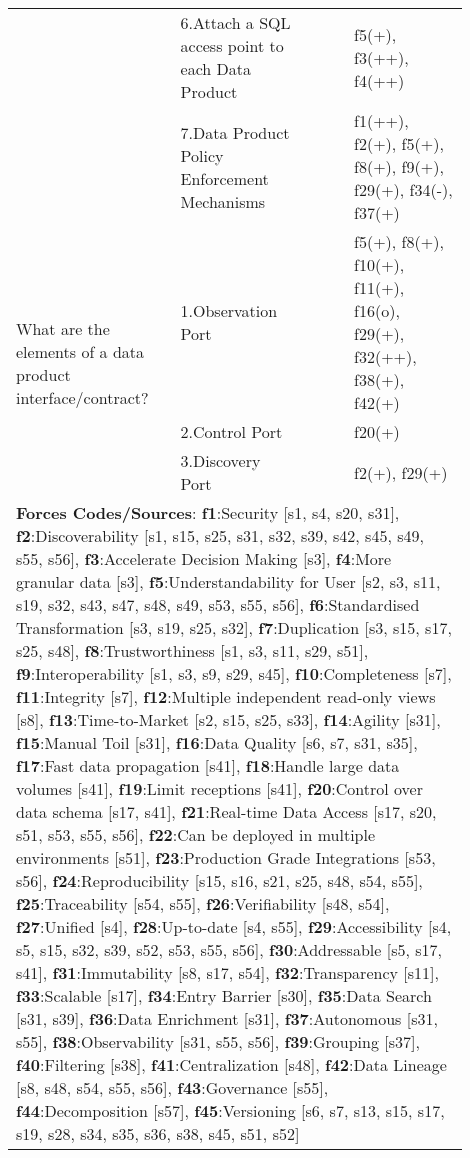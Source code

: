 \begin{tabular}{|p{0.12\linewidth}|p{0.015\linewidth}|p{0.3\linewidth}|p{0.15\linewidth}|p{0.31\linewidth}|}
 & \cellcolor{emerald_shape_7}{} & 6.Attach a SQL access point to each Data Product&\cellcolor{emerald_shape_5}{s2, s3, s5, s7, s10, s13, s14, s15, s16, s27, s30, s31, s32, s36, s37, s38, s39, s43, s46, s48, s49} & f5(+), f3(++), f4(++)\\
 & \multirow{-7}{\linewidth}{ \cellcolor{emerald_shape_7}{49}} &7.Data Product Policy Enforcement Mechanisms&\cellcolor{emerald_shape_5}{s1, s3, s4, s5, s6, s12, s15, s20, s23, s27, s31, s32, s36, s38, s39, s40, s43, s47, s52, s56} & f1(++), f2(+), f5(+), f8(+), f9(+), f29(+), f34(-), f37(+)\\
\multirow{3}{\linewidth}{What are the elements of a data product interface/contract?} &\cellcolor{emerald_shape_3}{} &1.Observation Port&\cellcolor{emerald_shape_6}{s3, s7, s11, s13, s22, s52} & f5(+), f8(+), f10(+), f11(+), f16(o), f29(+), f32(++), f38(+), f42(+)\\
 & \cellcolor{emerald_shape_3}{} & 2.Control Port&\cellcolor{emerald_shape_4}{s49, s52} & f20(+)\\
 & \multirow{-3}{\linewidth}{ \cellcolor{emerald_shape_3}{9}} &3.Discovery Port&\cellcolor{emerald_shape_5}{s20, s25, s49, s52} & f2(+), f29(+)\\
\hline
\multicolumn{5}{l}{\parbox{\textwidth}{\smallskip
{\bf Forces Codes/Sources}: {\bf f1}:Security [s1, s4, s20, s31], {\bf f2}:Discoverability [s1, s15, s25, s31, s32, s39, s42, s45, s49, s55, s56], {\bf f3}:Accelerate Decision Making [s3], {\bf f4}:More granular data [s3], {\bf f5}:Understandability for User [s2, s3, s11, s19, s32, s43, s47, s48, s49, s53, s55, s56], {\bf f6}:Standardised Transformation [s3, s19, s25, s32], {\bf f7}:Duplication [s3, s15, s17, s25, s48], {\bf f8}:Trustworthiness [s1, s3, s11, s29, s51], {\bf f9}:Interoperability [s1, s3, s9, s29, s45], {\bf f10}:Completeness [s7], {\bf f11}:Integrity [s7], {\bf f12}:Multiple independent read-only views [s8], {\bf f13}:Time-to-Market [s2, s15, s25, s33], {\bf f14}:Agility [s31], {\bf f15}:Manual Toil [s31], {\bf f16}:Data Quality [s6, s7, s31, s35], {\bf f17}:Fast data propagation [s41], {\bf f18}:Handle large data volumes [s41], {\bf f19}:Limit receptions [s41], {\bf f20}:Control over data schema [s17, s41], {\bf f21}:Real-time Data Access [s17, s20, s51, s53, s55, s56], {\bf f22}:Can be deployed in multiple environments [s51], {\bf f23}:Production Grade Integrations [s53, s56], {\bf f24}:Reproducibility [s15, s16, s21, s25, s48, s54, s55], {\bf f25}:Traceability [s54, s55], {\bf f26}:Verifiability [s48, s54], {\bf f27}:Unified [s4], {\bf f28}:Up-to-date [s4, s55], {\bf f29}:Accessibility [s4, s5, s15, s32, s39, s52, s53, s55, s56], {\bf f30}:Addressable [s5, s17, s41], {\bf f31}:Immutability [s8, s17, s54], {\bf f32}:Transparency [s11], {\bf f33}:Scalable [s17], {\bf f34}:Entry Barrier [s30], {\bf f35}:Data Search [s31, s39], {\bf f36}:Data Enrichment [s31], {\bf f37}:Autonomous [s31, s55], {\bf f38}:Observability [s31, s55, s56], {\bf f39}:Grouping [s37], {\bf f40}:Filtering [s38], {\bf f41}:Centralization [s48], {\bf f42}:Data Lineage [s8, s48, s54, s55, s56], {\bf f43}:Governance [s55], {\bf f44}:Decomposition [s57], {\bf f45}:Versioning [s6, s7, s13, s15, s17, s19, s28, s34, s35, s36, s38, s45, s51, s52]}}

\end{tabular}
